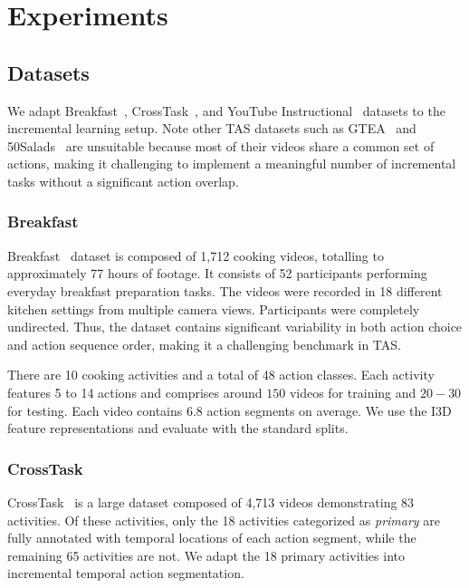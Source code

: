 \chapter{Experiments}
\label{ch:exp}

\section{Datasets}

We adapt Breakfast~\cite{kuehne2014language}, CrossTask~\cite{zhukov2019crosstask}, and YouTube Instructional~\cite{alayrac2016unsupervised}  datasets to the incremental learning setup. Note other TAS datasets such as GTEA~
\cite{fathi2011learning} and 50Salads~\cite{stein2013combining} are unsuitable because most of their videos share a common set of actions, making it challenging to implement a meaningful number of incremental tasks without a significant action overlap.



\subsection{Breakfast}

Breakfast~\cite{kuehne2014language} dataset is composed of 1,712 cooking videos, totalling to approximately 77 hours of footage. It consists of 52 participants performing everyday breakfast preparation tasks. The videos were recorded in 18 different kitchen settings from multiple camera views. Participants were completely undirected. Thus, the dataset contains significant variability in both action choice and action sequence order, making it a challenging benchmark in TAS.

There are 10 cooking activities and a total of 48 action classes. Each activity features 5 to 14 actions and comprises around $150$ videos for training and $20\!-\!30$ for testing. Each video contains 6.8 action segments on average. We use the I3D~\cite{carreira2017quo} feature representations and evaluate with the standard splits.

\subsection{CrossTask}
\label{sub:crosstak}

CrossTask~\cite{zhukov2019crosstask} is a large dataset  composed of 4,713 videos demonstrating 83 activities. Of these activities, only the 18 activities categorized as \emph{primary} are fully annotated with temporal locations of each action segment, while the remaining 65 activities are not. We adapt the 18 primary activities into incremental temporal action segmentation.


